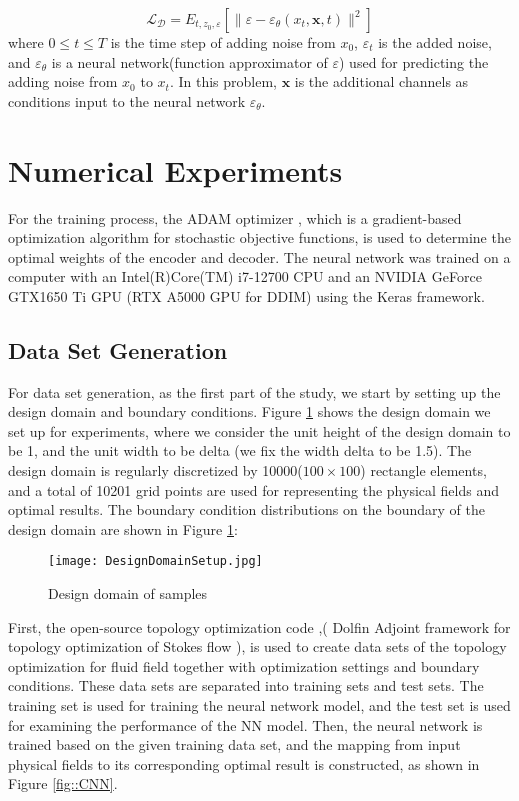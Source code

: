 \documentclass{article}
\begin{document}
\begin{equation}
\mathcal{L_D}=E_{t, z_0, \varepsilon}\left[\| \varepsilon-\varepsilon_\theta\left(x_t, \mathbf{x}, t\right) \|^2\right]
\end{equation}
where $0 \leq t \leq T$ is the time step of adding noise from $x_0$, $\varepsilon_t$ is the added noise, and $\varepsilon_{\theta}$ is a neural network(function approximator of $\varepsilon$) used for predicting the adding noise from $x_0$ to $x_t$. In this problem, $\mathbf{x}$ is the additional channels as conditions input to the neural network $\varepsilon_{\theta}$.

\section{Numerical Experiments}
For the training process, the ADAM optimizer \cite{3-1kingma2014adam}, which is a gradient-based optimization algorithm for stochastic objective functions, is used to determine the optimal weights of the encoder and decoder. The neural network was trained on a computer with an Intel(R)Core(TM) i7-12700 CPU and an NVIDIA GeForce GTX1650 Ti GPU (RTX A5000 GPU for DDIM) using the Keras framework.\\
\subsection{Data Set Generation \label{Sec::DataSet}}

 For data set generation, as the first part of the study, we start by setting up the design domain and boundary conditions. Figure \ref{fig::RegionFst} shows the design domain we set up for experiments, where we consider the unit height of the design domain to be 1, and the unit width to be delta (we fix the width delta to be 1.5). The design domain is regularly discretized by 10000($100 \times 100$) rectangle elements, and a total of 10201 grid points are used for representing the physical fields and optimal results. The boundary condition distributions on the boundary of the design domain are shown in Figure \ref{fig::RegionFst}:
\begin{figure}
    \centering
    \texttt{[image: DesignDomainSetup.jpg]}
    \caption{Design domain of samples}
    \label{fig::RegionFst}
\end{figure}

 First, the open-source topology optimization code \cite{5-borrvall2003topology, 5-1-guillaume2004topological, 5-2-aage2008topology},( Dolfin Adjoint framework for topology optimization of Stokes flow \cite{2-mitusch2019dolfin, 5-borrvall2003topology}), is used to create data sets of the topology optimization for fluid field together with optimization settings and boundary conditions. These data sets are separated into training sets and test sets. The training set is used for training the neural network model, and the test set is used for examining the performance of the NN model. Then, the neural network is trained based on the given training data set, and the mapping from input physical fields to its corresponding optimal result is constructed, as shown in Figure \ref{fig::CNN}.
\end{document}
